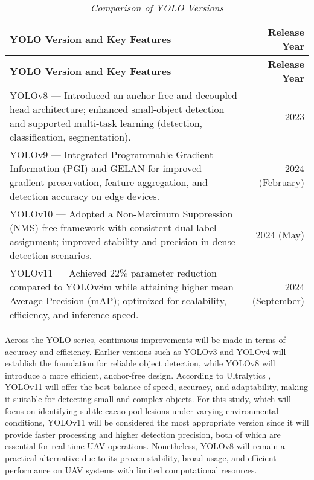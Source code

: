 \begin{longtable}{p{8cm} r}
	\caption{\textit{Comparison of YOLO Versions}} \label{tab:yolo_comparison} \\
	
	\toprule
	\textbf{YOLO Version and Key Features} & \textbf{Release Year} \\
	\midrule
	\endfirsthead
	
	\toprule
	\textbf{YOLO Version and Key Features} & \textbf{Release Year} \\
	\midrule
	\endhead
	
	\bottomrule
	\endfoot
	
	YOLOv8 — Introduced an anchor-free and decoupled head architecture; enhanced small-object detection and supported multi-task learning (detection, classification, segmentation). & 2023 \\
	\midrule
	YOLOv9 — Integrated Programmable Gradient Information (PGI) and GELAN for improved gradient preservation, feature aggregation, and detection accuracy on edge devices. & 2024 (February) \\
	\midrule
	YOLOv10 — Adopted a Non-Maximum Suppression (NMS)-free framework with consistent dual-label assignment; improved stability and precision in dense detection scenarios. & 2024 (May) \\
	\midrule
	YOLOv11 — Achieved 22\% parameter reduction compared to YOLOv8m while attaining higher mean Average Precision (mAP); optimized for scalability, efficiency, and inference speed. & 2024 (September) \\
\end{longtable}

Across the YOLO series, continuous improvements will be made in terms of accuracy and efficiency. Earlier versions such as YOLOv3 and YOLOv4 will establish the foundation for reliable object detection, while YOLOv8 will introduce a more efficient, anchor-free design. According to Ultralytics \cite{UltralyticsBlog2025}, YOLOv11 will offer the best balance of speed, accuracy, and adaptability, making it suitable for detecting small and complex objects. For this study, which will focus on identifying subtle cacao pod lesions under varying environmental conditions, YOLOv11 will be considered the most appropriate version since it will provide faster processing and higher detection precision, both of which are essential for real-time UAV operations. Nonetheless, YOLOv8 will remain a practical alternative due to its proven stability, broad usage, and efficient performance on UAV systems with limited computational resources.

